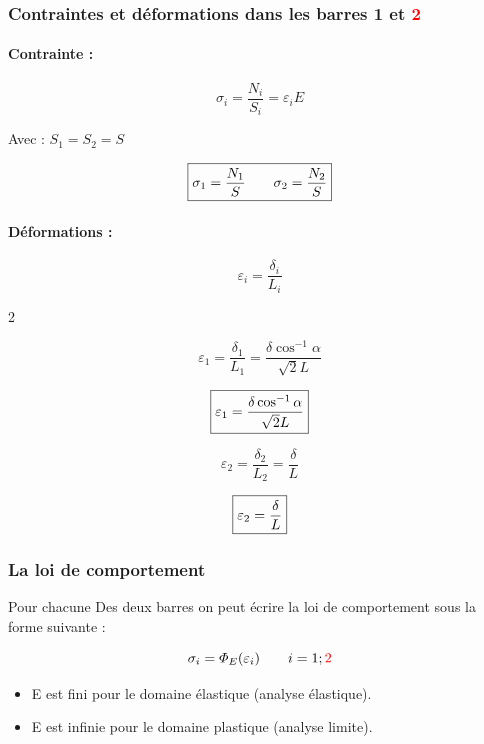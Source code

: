 \documentclass[12pt,a4paper]{report}
\newcommand{\sgma}[1]{\sigma_{#1}}
\begin{document}
	
	\subsubsection{Contraintes et déformations dans les barres 1 et \textcolor{red}{2}}
	
	\paragraph{Contrainte :}
	
	\[ \sgma{i} = \dfrac{N_{i}}{S_{i}} = \varepsilon_{i}E \]
	
	Avec : $S_{1} = S_{2} = S$
	
	\[ \fbox{$\sgma{1} = \dfrac{N_{1}}{S} \qquad \sgma{2} = \dfrac{N_{2}}{S}$} \]
	
	\paragraph{Déformations :}
	
	\[ \varepsilon_{i} = \dfrac{\delta_{i}}{L_{i}} \]
	
	
	\begin{multicols}{2}
		
		
		\[ \varepsilon_{1} = \dfrac{\delta_{1}}{L_{1}} = \dfrac{\delta\cos^{-1}\alpha}{\sqrt{2}L} \]
		
		\[ \fbox{$\varepsilon_{1} = \dfrac{\delta\cos^{-1}\alpha}{\sqrt{2}L} $} \]
		
		
		\columnbreak
		
		\[ \varepsilon_{2} = \dfrac{\delta_{2}}{L_{2}} = \dfrac{\delta}{L} \]
		
		\[ \fbox{$\varepsilon_{2} = \dfrac{\delta}{L}$} \]
		
	\end{multicols}
	
	\subsubsection{La loi de comportement}
	
	Pour chacune Des deux barres on peut écrire la loi de comportement sous la forme suivante : 
	
	\[ \sgma{i} = \varPhi_{E}(\varepsilon_{i}) \qquad \small i = 1;\textcolor{red}{2} \]
	
	
	\begin{itemize}
		\item E est fini pour le domaine élastique (analyse élastique).
		\item E est infinie pour le domaine plastique (analyse limite).
	\end{itemize}
	
\end{document}
